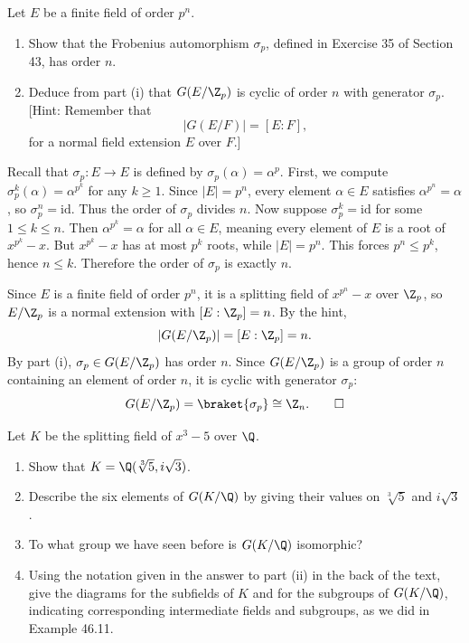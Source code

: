 \begin{problem}[45.11]
  Let $E$ be a finite field of order $p^n$.
  \begin{enumerate}
    \item Show that the Frobenius automorphism $\sigma_p$, defined in Exercise 35 of Section 43, has order $n$.
    \item Deduce from part (i) that $G(E/\Z_p)$ is cyclic of order $n$ with generator $\sigma_p$. [Hint: Remember that
      \[%
        |G(E/F)| = [E : F]
      ,\]%
      for a normal field extension $E$ over $F$.]
  \end{enumerate}
\end{problem}

\begin{solution}[(i)]
  Recall that $\sigma_p : E \to E$ is defined by $\sigma_p(\alpha) = \alpha^p$. First, we compute $\sigma_p^k(\alpha) = \alpha^{p^k}$ for any $k \geq 1$. Since $|E| = p^n$, every element $\alpha \in E$ satisfies $\alpha^{p^n} = \alpha$, so $\sigma_p^n = \text{id}$. Thus the order of $\sigma_p$ divides $n$. Now suppose $\sigma_p^k = \text{id}$ for some $1 \leq k \leq n$. Then $\alpha^{p^k} = \alpha$ for all $\alpha \in E$, meaning every element of $E$ is a root of $x^{p^k} - x$. But $x^{p^k} - x$ has at most $p^k$ roots, while $|E| = p^n$. This forces $p^n \leq p^k$, hence $n \leq k$. Therefore the order of $\sigma_p$ is exactly $n$.
\end{solution}

\begin{solution}[(ii)]
  Since $E$ is a finite field of order $p^n$, it is a splitting field of $x^{p^n} - x$ over $\Z_p$, so $E/\Z_p$ is a normal extension with $[E : \Z_p] = n$. By the hint,
  \[%
    |G(E/\Z_p)| = [E : \Z_p] = n
  .\]%
  By part (i), $\sigma_p \in G(E/\Z_p)$ has order $n$. Since $G(E/\Z_p)$ is a group of order $n$ containing an element of order $n$, it is cyclic with generator $\sigma_p$:
  \[%
    G(E/\Z_p) = \braket{\sigma_p} \cong \Z_n
  .\qedhere\]%
\end{solution}

\begin{problem}[46.11]
  Let $K$ be the splitting field of $x^3 - 5$ over $\Q$.
  \begin{enumerate}
    \item Show that $K = \Q(\sqrt[3]{5}, i\sqrt{3})$.
    \item Describe the six elements of $G(K/\Q)$ by giving their values on $\sqrt[3]{5}$ and $i\sqrt{3}$.
    \item To what group we have seen before is $G(K/\Q)$ isomorphic?
    \item Using the notation given in the answer to part (ii) in the back of the text, give the diagrams for the subfields of $K$ and for the subgroups of $G(K/\Q)$, indicating corresponding intermediate fields and subgroups, as we did in Example 46.11.
  \end{enumerate}
\end{problem}

